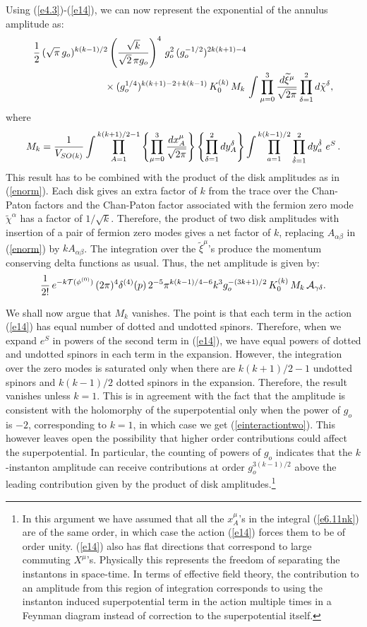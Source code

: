 \documentclass[12pt,a4paper]{article}
\newcommand{\be}{\begin{equation}}
\newcommand{\ee}{\end{equation}}
\newcommand{\refb}[1]{(\ref{#1})}
\def\({\left(}
\def\){\right)}
\newcommand{\AAA}{{\cal A}}
\newcommand{\wt}{\widetilde}
\newcommand{\TT}{{\cal T}}
\def\KKZ{K_0}
\def\ddelta{{\dot\delta}}
\begin{document}
Using \refb{e4.3}-\refb{e14}, we can now represent the exponential of the annulus
amplitude as:
\be
\begin{split}
&{1\over 2}\,(\sqrt{\pi}\, g_o)^{k(k-1)/2}
\(\frac{\sqrt k}{\sqrt{2}\, \pi g_o}\)^4 \, g_o^2\, (g_o^{-1/2})^{2k (k+1)-4}
\\
& \hskip 1in \times
(g_o^{1/4})^{k(k+1)-2 + k(k-1)} \,\KKZ^{(k)}\,
M_k \, \int\prod_{\mu=0}^3 \frac{d\wt\xi^\mu}{\sqrt{2\pi}} \prod_{\delta=1}^{2} d\tilde\chi^\delta,
\end{split}
\ee
where
\be \label{e6.11nk}
M_k ={1\over V_{SO(k)}} \int \prod_{A=1}^{k(k+1)/2 -1} \left\{\prod_{\mu=0}^3 \frac{dx^\mu_A}{\sqrt{2\pi}} \right\}
\left\{\prod_{\delta=1}^2 dy^\delta_A \right\} \int\prod_{a=1}^{k(k-1)/2}
\prod_{\ddelta=1}^2 dy^\ddelta_a\ e^S\, .
\ee
This result has to be combined with the product of the disk amplitudes as in \refb{enorm}.
Each disk gives an extra factor of $k$ from the trace over the Chan-Paton factors and the
Chan-Paton factor associated with the fermion zero mode $\tilde\chi^\alpha$ has a factor
of $1/\sqrt k$. Therefore, the product of two disk amplitudes with insertion of a pair
of fermion zero modes gives a net factor of $k$, replacing $A_{\alpha\beta}$ in
\refb{enorm} by $k A_{\alpha\beta}$. The integration over the $\wt\xi^\mu$'s produce the
momentum conserving delta functions as usual.
Thus, the net amplitude is given by:
\be \label{e4.12}
{1\over 2!}\, e^{-k\TT(\phi^{(0)})}\, (2\pi)^4 \delta^{(4)}(p)\,  2^{-5} \pi^{k(k-1)/4 -6} k^3
g_o^{-(3k+1)/2}
\, \KKZ^{(k)}\,M_k   \,  \AAA_{\gamma\delta}.
\ee

We shall now argue that $M_k$ vanishes. The point is that each term in the action
\refb{e14} has equal number of dotted and undotted spinors. Therefore, when we expand $e^S$
in powers of the second term in \refb{e14}, we have equal powers of dotted and undotted spinors in each term
in the expansion. However, the integration over the zero modes is saturated only when there
are $k(k+1)/2-1$ undotted spinors and $k(k-1)/2$ dotted spinors in the expansion. Therefore, the
result vanishes unless $k=1$.
This is in agreement with the fact that the amplitude is consistent with the holomorphy of the
superpotential only when the power of $g_o$ is $-2$, corresponding to $k=1$, in which
case we get \refb{einteractiontwo}. This however leaves
open the possibility that higher order contributions could affect the superpotential. In particular,
the counting of powers of $g_o$ indicates that the $k$-instanton amplitude can receive
contributions at order $g_o^{3(k-1)/2}$ above the leading contribution given by the product of
disk amplitudes.\footnote{In this argument we have assumed that all the $x^\mu_A$'s in
the integral \refb{e6.11nk} are of the same order, in which case the action
\refb{e14} forces them to be of order
unity. \refb{e14} also has flat directions that correspond to large commuting $X^\mu$'s.
Physically this represents the freedom of separating the instantons in space-time. In
terms of effective field theory, the contribution to an amplitude from this region of
integration corresponds to using the instanton induced superpotential
term in the action multiple times in a Feynman diagram instead of correction to the
superpotential itself.}
\end{document}
